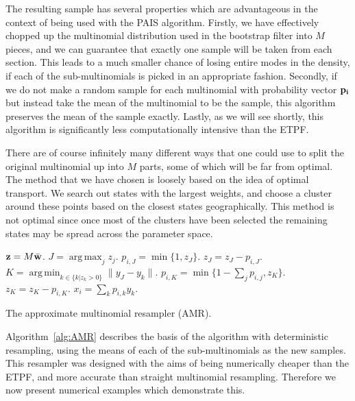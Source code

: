 \documentclass[final]{siamltex}
\renewcommand{\b}[1]{{\bf #1}}
\DeclareMathOperator*{\argmin}{arg\,min}
\DeclareMathOperator*{\argmax}{arg\,max}
\begin{document}
The resulting sample has several properties which are advantageous in
the context of being used with the PAIS algorithm. Firstly, we have
effectively chopped up the multinomial distribution used in the
bootstrap filter into $M$ pieces, and we can guarantee that exactly
one sample will be taken from each section. This leads to a much
smaller chance of losing entire modes in the density, if each of the
sub-multinomials is picked in an appropriate fashion. Secondly, if we do not make a random sample for
each multinomial with probability vector $\bf p_i$ but instead take
the mean of the multinomial to be the sample, this algorithm preserves
the mean of the sample exactly. Lastly, as we will see shortly, this
algorithm is significantly less computationally intensive than the
ETPF.

There are of course infinitely many different ways that one could use
to split the original multinomial up into $M$ parts, some of which
will be far from optimal. The method that we have chosen is loosely
based on the idea of optimal transport. We search out states with the
largest weights, and choose a cluster around these points based on
the closest states geographically. This method is not optimal since
once most of the clusters have been selected the remaining states
may be spread across the parameter space.

\begin{table}[!h]
\centering
\begin{algorithm}[H]
\DontPrintSemicolon
\BlankLine
	$\b{z} = M\bar{\b{w}}$.\;
	{
		$J = \argmax_j z_j$.\;
		$p_{i,J} = \min\{1,z_J\}$.\;
		$z_J = z_J - p_{i,J}$.\;
		{
			$K = \argmin_{k \in \{k|z_k>0\}} \|y_J - y_k\|$.\;
			$p_{i,K} = \min\{1-\sum_j p_{i,j}, z_K\}$.\;
			$z_K = z_K - p_{i,K}$.\;
		}
		$x_i = \sum_k p_{i,k}y_k$.\;
	}
\caption{The approximate multinomial resampler (AMR).\label{alg:AMR}}
\end{algorithm}
\end{table}

Algorithm~\ref{alg:AMR} describes the basis of the algorithm with
deterministic resampling, using the means of each of the
sub-multinomials as the new samples. This resampler was designed with the aims of being
numerically cheaper than the ETPF, and more accurate than straight multinomial
resampling. Therefore we now present numerical examples which
demonstrate this.
\end{document}
